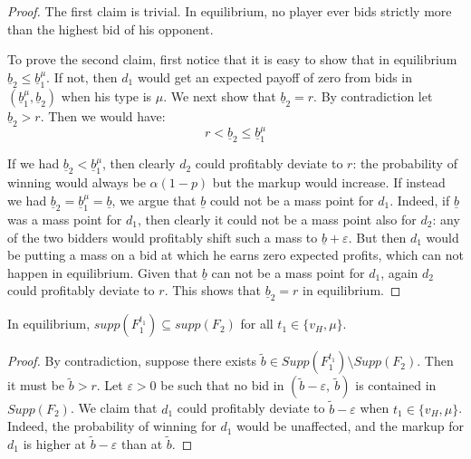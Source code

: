 \begin{proof}
The first claim is trivial. In equilibrium, no player ever bids strictly more than the highest bid of his opponent.

\noindent To prove the second claim, first notice that it is easy to show that in equilibrium $ \underline{b}_2 \leq \underline{b}_1^{\mu} $. If not, then $ d_1 $ would get an expected payoff of zero from bids in $ (\underline{b}_1^{\mu}, \underline{b}_2) $ when his type is $ \mu $. We next show that $ \underline{b}_2 = r $. By contradiction let $ \underline{b}_2 > r $. Then we would have:
\begin{equation*}
r < \underline{b}_2 \leq \underline{b}_1^{\mu}
\end{equation*}

\noindent If we had $ \underline{b}_2 < \underline{b}_1^{\mu} $, then clearly $ d_2 $ could profitably deviate to $ r $: the probability of winning would always be $ \alpha (1 - p) $ but the markup would increase. If instead we had $ \underline{b}_2 = \underline{b}_1^{\mu} = \underline{b} $, we argue that $ \underline b $ could not be a mass point for $ d_1 $. Indeed, if $ \underline b $ was a mass point for $ d_1 $, then clearly it could not be a mass point also for $ d_2 $: any of the two bidders would profitably shift such a mass to $ \underline{b} + \varepsilon $. But then $ d_1 $ would be putting a mass on a bid at which he earns zero expected profits, which can not happen in equilibrium. Given that $ \underline b $ can not be a mass point for $ d_1 $, again $ d_2 $ could profitably deviate to $ r $. This shows that $ \underline{b}_2 = r $ in equilibrium.
\end{proof}

\begin{lem}\label{lem:inclusion}
In equilibrium, $ supp \left( F_1^{t_1} \right) \subseteq supp \left(F_2\right) $ for all $ t_1 \in \{ v_H, \mu \} $.
\end{lem}

\begin{proof}
 By contradiction, suppose there exists $ \tilde{b} \in Supp\left(F_1^{t_1}\right) \setminus Supp(F_2) $. Then it must be $ \tilde b > r $. Let $ \varepsilon > 0 $ be such that no bid in $ (\tilde b - \varepsilon,\ \tilde b) $ is contained in $ Supp(F_2) $. We claim that $ d_1 $ could profitably deviate to $ \tilde b - \varepsilon $ when $ t_1 \in \{ v_H, \mu \} $. Indeed, the probability of winning for $ d_1 $ would be unaffected, and the markup for $ d_1 $ is higher at $ \tilde b - \varepsilon $ than at $ \tilde b $.
\end{proof}

